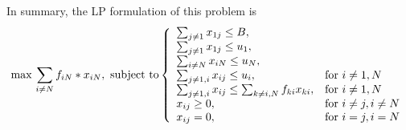 \documentclass{article}
\begin{document}
In summary, the LP formulation of this problem is
\begin{equation}  
\max \,\sum_{i \not= N} f_{iN} * x_{iN}, \text{ subject to}
\left\{  
             \begin{array}{ll}
             \sum_{j\not= 1}x_{1j}\leq B,\\
             \sum_{j\not= 1}x_{1j}\leq u_1,\\
             \sum_{i\not= N}x_{iN}\leq u_N,\\
             \sum_{j\not= 1, i}x_{ij}\leq u_i,& \textnormal{for~} i\not= 1,N\\
             \sum_{j\not= 1, i}x_{ij}\leq \sum_{k\not=i,N}f_{ki} x_{ki},& \textnormal{for~} i\not= 1,N\\
             x_{ij}\geq 0, & \textnormal{for~} i\not= j,i\not=N\\
             x_{ij}=0, & \textnormal{for~} i= j,i=N
             \end{array}  
\right.  
\end{equation}  
\end{document}
